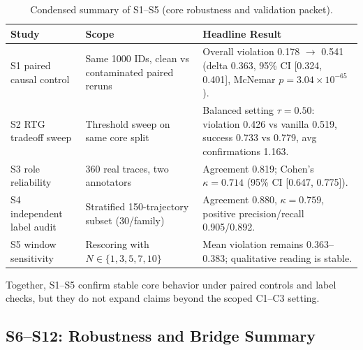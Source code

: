 \begin{table}[t]
\centering
\scriptsize
\caption{Condensed summary of S1--S5 (core robustness and validation packet).}
\begin{tabularx}{\textwidth}{L{2.1cm}L{3.4cm}Y}
\toprule
\textbf{Study} & \textbf{Scope} & \textbf{Headline Result} \\
\midrule
S1 paired causal control & Same 1000 IDs, clean vs contaminated paired reruns & Overall violation 0.178 $\rightarrow$ 0.541 (delta 0.363, 95\% CI [0.324, 0.401], McNemar $p=3.04\times10^{-65}$). \\
S2 RTG tradeoff sweep & Threshold sweep on same core split & Balanced setting $\tau=0.50$: violation 0.426 vs vanilla 0.519, success 0.733 vs 0.779, avg confirmations 1.163. \\
S3 role reliability & 360 real traces, two annotators & Agreement 0.819; Cohen's $\kappa=0.714$ (95\% CI [0.647, 0.775]). \\
S4 independent label audit & Stratified 150-trajectory subset (30/family) & Agreement 0.880, $\kappa=0.759$, positive precision/recall 0.905/0.892. \\
S5 window sensitivity & Rescoring with $N\in\{1,3,5,7,10\}$ & Mean violation remains 0.363--0.383; qualitative reading is stable. \\
\bottomrule
\end{tabularx}
\label{tab:supp_s1_s5_summary}
\label{tab:supp_causal}
\label{tab:supp_tradeoff}
\label{tab:supp_reliability}
\label{tab:supp_audit}
\label{tab:supp_window}
\end{table}

Together, S1--S5 confirm stable core behavior under paired controls and label checks, but they do not expand claims beyond the scoped C1--C3 setting.

\subsection{S6--S12: Robustness and Bridge Summary}

